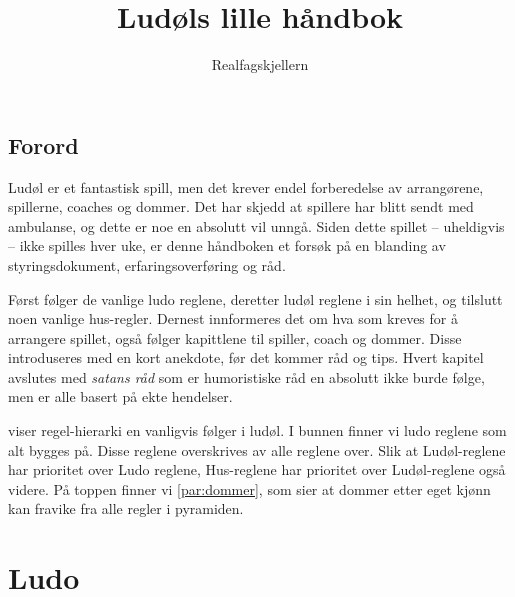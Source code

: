 \documentclass[10pt,a4paper,norsk,openany]{book}
\author{Realfagskjellern}
\title{Ludøls lille håndbok}
\begin{document}
\frontmatter

\maketitle

\titlespacing*{\chapter}{0pt}{50pt}{40pt}

\section*{Forord}

Ludøl er et fantastisk spill, men det krever endel forberedelse av arrangørene,
spillerne, coaches og dommer. Det har skjedd at spillere har blitt sendt med
ambulanse, og dette er noe en absolutt vil unngå. Siden dette spillet --
uheldigvis -- ikke spilles hver uke, er denne håndboken et forsøk på
en blanding av styringsdokument, erfaringsoverføring og råd. 

Først følger de vanlige ludo reglene, deretter ludøl reglene i sin helhet, og
tilslutt noen vanlige hus-regler. Dernest innformeres det om hva som kreves for
å arrangere spillet, også følger kapittlene til spiller, coach og dommer. Disse
introduseres med en kort anekdote, før det kommer råd og tips. Hvert kapitel
avslutes med \emph{satans råd} som er humoristiske råd en absolutt ikke burde
følge, men er alle basert på ekte hendelser.

 viser regel-hierarki en vanligvis følger i ludøl. I
bunnen finner vi ludo reglene som alt bygges på. Disse reglene overskrives av
alle reglene over. Slik at Ludøl-reglene har prioritet over Ludo reglene,
Hus-reglene har prioritet over Ludøl-reglene også videre. På toppen finner vi
\cref{par:dommer}, som sier at dommer etter eget kjønn kan fravike fra alle regler i
pyramiden.

\begin{figure}[htbp!]
  \centering
  
  \caption{}
  \label{fig:maslows-ludol}
\end{figure}



\tableofcontents


\mainmatter

\chapter{Ludo}
\end{document}
